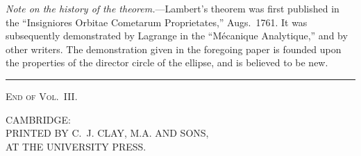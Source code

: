 \documentclass[11pt,a4paper]{article}
\newcommand{\mypar}{\par\medskip\noindent}
\begin{document}
\mypar
\textit{Note on the history of the theorem.}---Lambert's theorem was first
published in the ``Insigniores Orbitae Cometarum Proprietates,'' Augs.~1761.
It was subsequently demonstrated by Lagrange in the ``M\'ecanique Analytique,''
and by other writers. The demonstration given in the foregoing paper is founded
upon the properties of the director circle of the ellipse, and is believed to
be new.

\vspace{2cm}

\begin{center}
\rule{0.4\textwidth}{0.4pt}
\end{center}

\vspace{1cm}

\begin{center}
\textsc{End of Vol.~III.}
\end{center}

\vspace{2cm}

\begin{center}
CAMBRIDGE:\\
PRINTED BY C.~J. CLAY, M.A. AND SONS,\\
AT THE UNIVERSITY PRESS.
\end{center}
\end{document}
